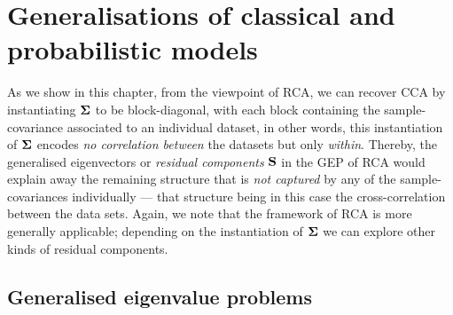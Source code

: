 \chapter[Generalisations of classical and probabilistic models]{Generalisations of classical and probabilistic models} \label{chap4:RCAgeneralisations}
\ifpdf
    \graphicspath{{Chapter4/Chapter4Figs/PNG/}{Chapter4/Chapter4Figs/PDF/}{Chapter4/Chapter4Figs/}}
\else
    \graphicspath{{Chapter4/Chapter4Figs/EPS/}{Chapter4/Chapter4Figs/}}
\fi


  As we show in this chapter, from the viewpoint of RCA, we can recover CCA by instantiating $\mathbf{\Sigma}$ to be block-diagonal, with each block containing the sample-covariance associated to an individual dataset, in other words, this instantiation of $\mathbf{\Sigma}$ encodes \emph{no correlation between} the datasets but only \emph{within}.
  Thereby, the generalised eigenvectors or \textit{residual components} $\mathbf{S}$ in the GEP of RCA would explain away the remaining structure that is \emph{not captured} by any of the sample-covariances individually --- that structure being in this case the cross-correlation between the data sets. Again, we note that the framework of RCA is more generally applicable; depending on the instantiation of $\mathbf{\Sigma}$ we can explore other kinds of residual components.

    
  \section{Generalised eigenvalue problems} \label{sec:chap4_GEPs}
    
